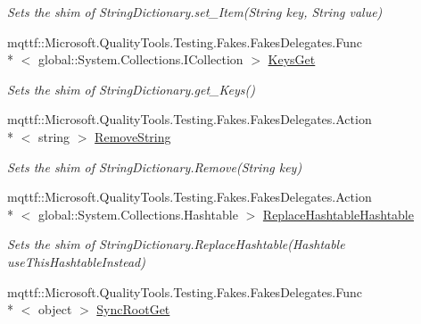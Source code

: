 \begin{DoxyCompactItemize}
\begin{DoxyCompactList}\small\item\em Sets the shim of String\-Dictionary.\-set\-\_\-\-Item(\-String key, String value)\end{DoxyCompactList}\item 
mqttf\-::\-Microsoft.\-Quality\-Tools.\-Testing.\-Fakes.\-Fakes\-Delegates.\-Func\\*
$<$ global\-::\-System.\-Collections.\-I\-Collection $>$ \hyperlink{class_system_1_1_collections_1_1_specialized_1_1_fakes_1_1_shim_string_dictionary_a2ecfa05285a691c1959c7c2645bf2462}{Keys\-Get}
\begin{DoxyCompactList}\small\item\em Sets the shim of String\-Dictionary.\-get\-\_\-\-Keys()\end{DoxyCompactList}\item 
mqttf\-::\-Microsoft.\-Quality\-Tools.\-Testing.\-Fakes.\-Fakes\-Delegates.\-Action\\*
$<$ string $>$ \hyperlink{class_system_1_1_collections_1_1_specialized_1_1_fakes_1_1_shim_string_dictionary_a0fe532f6be05876c3041c6698c81b85e}{Remove\-String}
\begin{DoxyCompactList}\small\item\em Sets the shim of String\-Dictionary.\-Remove(\-String key)\end{DoxyCompactList}\item 
mqttf\-::\-Microsoft.\-Quality\-Tools.\-Testing.\-Fakes.\-Fakes\-Delegates.\-Action\\*
$<$ global\-::\-System.\-Collections.\-Hashtable $>$ \hyperlink{class_system_1_1_collections_1_1_specialized_1_1_fakes_1_1_shim_string_dictionary_ad2bcc782e4b9c2cd4ed33dc260beb745}{Replace\-Hashtable\-Hashtable}
\begin{DoxyCompactList}\small\item\em Sets the shim of String\-Dictionary.\-Replace\-Hashtable(\-Hashtable use\-This\-Hashtable\-Instead)\end{DoxyCompactList}\item 
mqttf\-::\-Microsoft.\-Quality\-Tools.\-Testing.\-Fakes.\-Fakes\-Delegates.\-Func\\*
$<$ object $>$ \hyperlink{class_system_1_1_collections_1_1_specialized_1_1_fakes_1_1_shim_string_dictionary_a83daffaffea07a5b4a94a75198bc0433}{Sync\-Root\-Get}

\end{DoxyCompactItemize}
